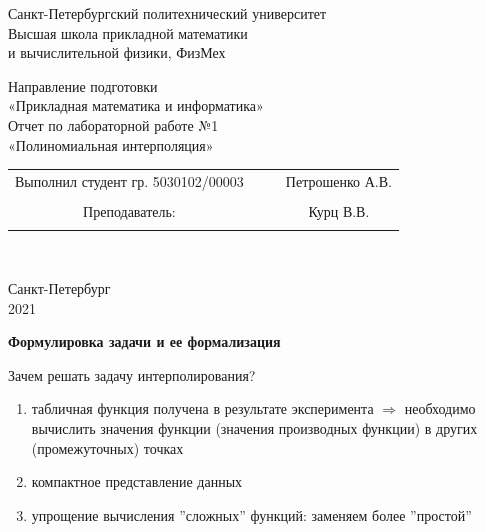\documentclass{article}
\begin{document}
	\begin{center}
		\hfill \break
		\begin{center}
			\huge{Санкт-Петербургский политехнический университет\\
				Высшая школа прикладной математики\\
				и вычислительной физики, ФизМех}
		\end{center}
		\hfill \break
		\hfill \break
		\hfill \break
		\hfill \break
		\hfill \break
		\huge{Направление подготовки\\
			«Прикладная математика и информатика»}\\
		\hfill \break
		\hfill \break
		\hfill \break
		\hfill \break
		\hfill \break
		\hfill \break
		\fontsize{14pt}{14pt}\selectfont
		Отчет по лабораторной работе №1\\
		«Полиномиальная интерполяция»\\
		\hfill \break
		\hfill \break
		\hfill \break
		\hfill \break
		\hfill \break
	\end{center}
	\hfill \break
	\hfill \break
	\fontsize{12pt}{12pt}\selectfont
	\begin{tabular}{cccc}
		\hspace{1cm}Выполнил студент гр. 5030102/00003 & {\hspace{3cm}} & & Петрошенко А.В. \\\\
		\hspace{-3cm}Преподаватель: &{\hspace{1cm}}& & {\hspace{1cm}} Курц В.В. \\\\
	\end{tabular}\\
	\hfill \break
	\hfill \break
	\hfill \break
	\hfill \break
	\hfill \break
	\hfill \break
	\begin{center} Санкт-Петербург\\ 
		2021\\
	\end{center}
	\thispagestyle{empty}
	\newpage
	\begin{center} \textbf{Формулировка задачи и ее формализация}\end{center}
	Зачем решать задачу интерполирования?
	\begin{enumerate}
		\item табличная функция получена в результате эксперимента $\Rightarrow$ необходимо вычислить значения функции (значения производных функции) в других (промежуточных) точках
		\item компактное представление данных
		\item упрощение вычисления ”сложных” функций: заменяем более ”простой”
	\end{enumerate}
\end{document}
